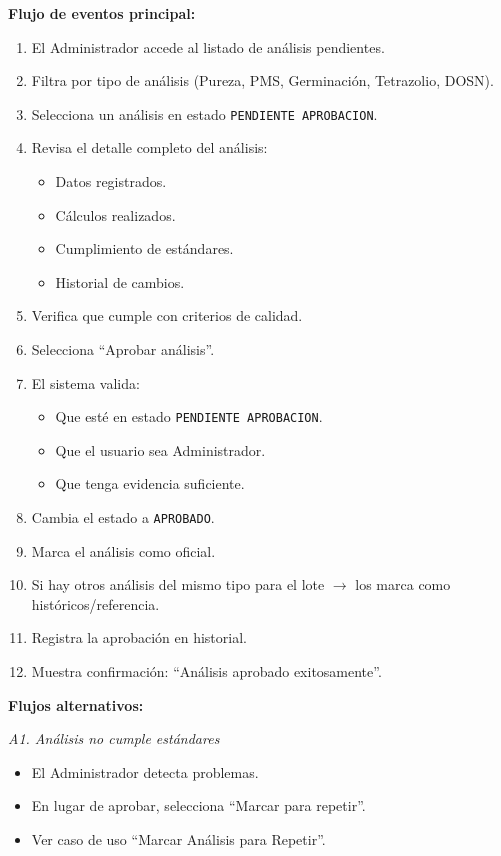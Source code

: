 \vspace{0.5em}
\noindent\textbf{Flujo de eventos principal:}
\begin{enumerate}[nosep]
    \item El Administrador accede al listado de análisis pendientes.
    \item Filtra por tipo de análisis (Pureza, PMS, Germinación, Tetrazolio, DOSN).
    \item Selecciona un análisis en estado \texttt{PENDIENTE APROBACION}.
    \item Revisa el detalle completo del análisis:
    \begin{itemize}[nosep]
        \item Datos registrados.
        \item Cálculos realizados.
        \item Cumplimiento de estándares.
        \item Historial de cambios.
    \end{itemize}
    \item Verifica que cumple con criterios de calidad.
    \item Selecciona ``Aprobar análisis''.
    \item El sistema valida:
    \begin{itemize}[nosep]
        \item Que esté en estado \texttt{PENDIENTE APROBACION}.
        \item Que el usuario sea Administrador.
        \item Que tenga evidencia suficiente.
    \end{itemize}
    \item Cambia el estado a \texttt{APROBADO}.
    \item Marca el análisis como oficial.
    \item Si hay otros análisis del mismo tipo para el lote $\rightarrow$ los marca como históricos/referencia.
    \item Registra la aprobación en historial.
    \item Muestra confirmación: ``Análisis aprobado exitosamente''.
\end{enumerate}

\vspace{0.5em}
\noindent\textbf{Flujos alternativos:}

\vspace{0.3em}
\noindent\textit{A1. Análisis no cumple estándares}
\begin{itemize}[nosep]
    \item El Administrador detecta problemas.
    \item En lugar de aprobar, selecciona ``Marcar para repetir''.
    \item Ver caso de uso ``Marcar Análisis para Repetir''.
\end{itemize}

